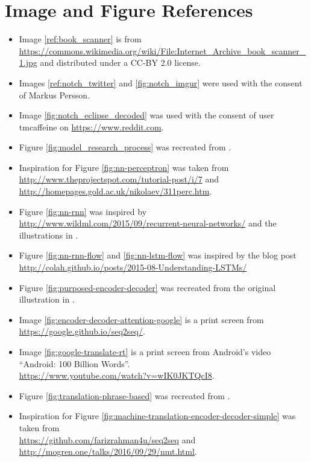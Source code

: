 
\chapter{Image and Figure References}

\begin{itemize}
    \item Image \ref{ref:book_scanner} is from \url{https://commons.wikimedia.org/wiki/File:Internet_Archive_book_scanner_1.jpg} and distributed under a CC-BY 2.0 license.
    \item Images \ref{ref:notch_twitter} and \ref{fig:notch_imgur} were used with the consent of Markus Persson.
    \item Image \ref{fig:notch_eclipse_decoded} was used with the consent of user tmcaffeine on \url{https://www.reddit.com}.
    \item Figure \ref{fig:model_research_process} was recreated from \cite{oates2005researching}.
    \item Inspiration for Figure \ref{fig:nn-perceptron} was taken from\\\url{http://www.theprojectspot.com/tutorial-post/i/7} and \\ \url{http://homepages.gold.ac.uk/nikolaev/311perc.htm}.
    \item Figure \ref{fig:nn-rnn} was inspired by \\ \url{http://www.wildml.com/2015/09/recurrent-neural-networks/} and the\\ illustrations in \cite{goodfellow2016deeplearning}.
    \item Figure \ref{fig:nn-rnn-flow} and \ref{fig:nn-lstm-flow} was inspired by the blog post \\ \url{http://colah.github.io/posts/2015-08-Understanding-LSTMs/}
    \item Figure \ref{fig:purposed-encoder-decoder} was recreated from the original illustration in  \cite{cho2014learning}.
    \item Image \ref{fig:encoder-decoder-attention-google} is a print screen from \url{https://google.github.io/seq2seq/}.
    \item Image \ref{fig:google-translate-rt} is a print screen from Android's video ``Android: 100 Billion Words''.\\ \url{https://www.youtube.com/watch?v=wIK0JKTQcI8}.
    \item Figure \ref{fig:translation-phrase-based} was recreated from \cite{koehn2010statistical}.
    \item Inspiration for Figure \ref{fig:machine-translation-encoder-decoder-simple} was taken from \\ \url{https://github.com/farizrahman4u/seq2seq} and\\\url{http://mogren.one/talks/2016/09/29/nmt.html}.
\end{itemize}